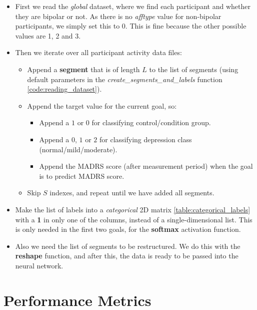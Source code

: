 \begin{itemize}
      \item First we read the \textit{global} dataset, where we find each participant and whether they are bipolar or not. As there is no \textit{afftype} value
            for non-bipolar participants, we simply set this to 0. This is fine because the other possible values are 1, 2 and 3.
      \item Then we iterate over all participant activity data files:

      \begin{itemize}
        \item Append a \textbf{segment} that is of length $L$ to the list of segments (using default parameters in the
              \textit{create\_segments\_and\_labels} function \ref{code:reading_dataset}).
        \item Append the target value for the current goal, so:
          \begin{itemize}
                \item Append a $1$ or $0$ for classifying control/condition group.
                \item Append a $0$, $1$ or $2$ for classifying depression class \\(normal/mild/moderate).
                \item Append the MADRS score (after measurement period) when the goal is to predict MADRS score.
          \end{itemize}  
        \item Skip $S$ indexes, and repeat until we have added all segments.
      \end{itemize}

      \item Make the list of labels into a \textit{categorical} 2D matrix \ref{table:categorical_labels} with a \textbf{1} in only one of the columns,
            instead of a single-dimensional list.
            This is only needed in the first two goals, for the \textbf{softmax} activation function.
      \item Also we need the list of segments to be restructured. We do this with the \textbf{reshape} function, 
            and after this, the data is ready to be passed into the neural network.
\end{itemize}

\section{Performance Metrics}

